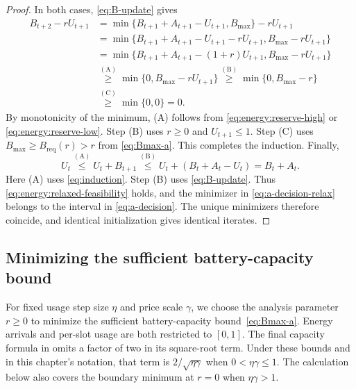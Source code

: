 \begin{proof}
In both cases, \eqref{eq:B-update} gives
\begin{equation}\label{eq:energy:reserve-step}
\begin{aligned}
 B_{t+2}-rU_{t+1}
 &=\min\{B_{t+1}+A_{t+1}-U_{t+1},B_{\mathrm{max}}\}-rU_{t+1}\\
 &=\min\{B_{t+1}+A_{t+1}-U_{t+1}-rU_{t+1},B_{\mathrm{max}}-rU_{t+1}\}\\
 &=\min\{B_{t+1}+A_{t+1}-(1+r)U_{t+1},B_{\mathrm{max}}-rU_{t+1}\}\\
 &\overset{\mathrm{(A)}}{\geq}\min\{0,B_{\mathrm{max}}-rU_{t+1}\}
   \overset{\mathrm{(B)}}{\geq}\min\{0,B_{\mathrm{max}}-r\}\\
 &\overset{\mathrm{(C)}}{\geq}\min\{0,0\}=0.
\end{aligned}
\end{equation}
By monotonicity of the minimum, (A) follows from
\eqref{eq:energy:reserve-high} or \eqref{eq:energy:reserve-low}.
Step (B) uses $r\geq0$ and $U_{t+1}\leq1$. Step (C) uses
$B_{\mathrm{max}}\geq B_{\mathrm{req}}(r)>r$ from \eqref{eq:Bmax-a}.
This completes the induction. Finally,
\begin{equation}\label{eq:energy:feasibility-consequence}
 U_t\overset{\mathrm{(A)}}{\leq}U_t+B_{t+1}
 \overset{\mathrm{(B)}}{\leq}U_t+(B_t+A_t-U_t)=B_t+A_t.
\end{equation}
Here (A) uses \eqref{eq:induction}. Step (B) uses \eqref{eq:B-update}.
Thus \eqref{eq:energy:relaxed-feasibility} holds, and the minimizer in
\eqref{eq:a-decision-relax} belongs to the interval in \eqref{eq:a-decision}.
The unique minimizers therefore coincide, and identical initialization
gives identical iterates.
\end{proof}

\subsection{Minimizing the sufficient battery-capacity bound}

For fixed usage step size $\eta$ and price scale $\gamma$, we choose the
analysis parameter $r\geq0$ to minimize the sufficient battery-capacity
bound~\eqref{eq:Bmax-a}. Energy arrivals and per-slot usage are both
restricted to $[0,1]$. The final capacity formula in
\cite[Section~4.2]{10.1145/3428337} omits a factor of two in its square-root
term. Under these bounds and in this chapter's notation, that term is
$2/\sqrt{\eta\gamma}$ when $0<\eta\gamma\leq1$. The calculation below
also covers the boundary minimum at $r=0$ when $\eta\gamma>1$.

